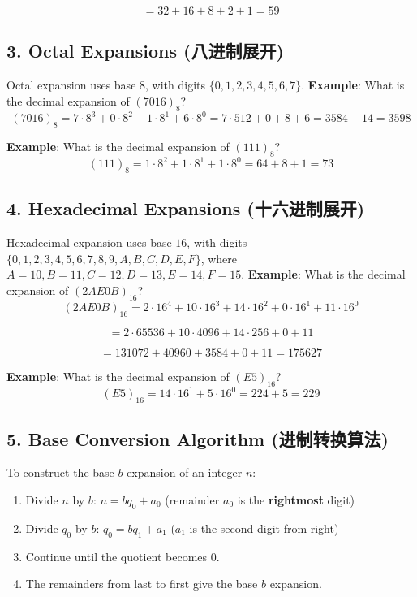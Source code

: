 \documentclass[10pt,a4paper,openany]{ctexbook}
\theoremstyle{definition}
\theoremstyle{remark}
\begin{document}
\[
= 32 + 16 + 8 + 2 + 1 = 59
\]

\vspace{-2pt}

\subsection{3. Octal Expansions (八进制展开)}

Octal expansion uses base $8$, with digits $\{0, 1, 2, 3, 4, 5, 6, 7\}$.
\textbf{Example}: What is the decimal expansion of $(7016)_8$?
\[
(7016)_8 = 7 \cdot 8^3 + 0 \cdot 8^2 + 1 \cdot 8^1 + 6 \cdot 8^0 = 7 \cdot 512 + 0 + 8 + 6 = 3584 + 14 = 3598
\]

\textbf{Example}: What is the decimal expansion of $(111)_8$?
\[
(111)_8 = 1 \cdot 8^2 + 1 \cdot 8^1 + 1 \cdot 8^0 = 64 + 8 + 1 = 73
\]

\vspace{-2pt}

\subsection{4. Hexadecimal Expansions (十六进制展开)}

Hexadecimal expansion uses base $16$, with digits $\{0,1,2,3,4,5,6,7,8,9,A,B,C,D,E,F\}$, where $A=10, B=11, C=12, D=13, E=14, F=15$.
\textbf{Example}: What is the decimal expansion of $(2A E0B)_{16}$?
\[
(2A E0B)_{16} = 2 \cdot 16^4 + 10 \cdot 16^3 + 14 \cdot 16^2 + 0 \cdot 16^1 + 11 \cdot 16^0
\]

\[
= 2 \cdot 65536 + 10 \cdot 4096 + 14 \cdot 256 + 0 + 11
\]

\[
= 131072 + 40960 + 3584 + 0 + 11 = 175627
\]

\textbf{Example}: What is the decimal expansion of $(E5)_{16}$?
\[
(E5)_{16} = 14 \cdot 16^1 + 5 \cdot 16^0 = 224 + 5 = 229
\]

\vspace{-2pt}

\subsection{5. Base Conversion Algorithm (进制转换算法)}

To construct the base $b$ expansion of an integer $n$:
\begin{enumerate}
\item Divide $n$ by $b$: $n = b q_0 + a_0$ (remainder $a_0$ is the \textbf{rightmost} digit)
\item Divide $q_0$ by $b$: $q_0 = b q_1 + a_1$ ($a_1$ is the second digit from right)
\item Continue until the quotient becomes $0$.
\item The remainders from last to first give the base $b$ expansion.

\end{enumerate}
\end{document}
